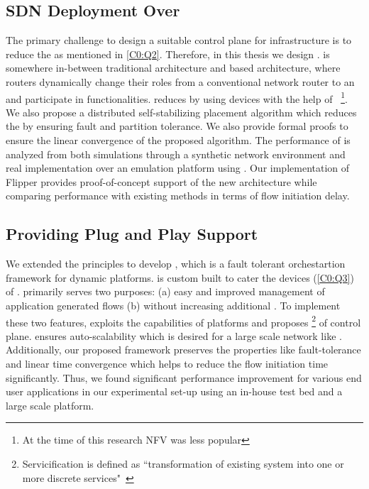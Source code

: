 \subsection{SDN Deployment Over }
The primary challenge to design a suitable  control plane for  infrastructure is to reduce the as mentioned in \cref{C0:Q2}. Therefore, in this thesis we design .  is somewhere in-between traditional architecture and  based architecture, where  routers dynamically change their roles from a conventional network router to an  and participate in  functionalities.  reduces  by using  devices with the help of ~\cite{koponen2010odc}\footnote{At the time of this research NFV was less popular}. We also propose a distributed self-stabilizing  placement algorithm which reduces the  by ensuring fault and partition tolerance. We also provide formal proofs to ensure the linear convergence of the proposed algorithm. The performance of  is analyzed from both simulations through a synthetic network environment and real implementation over an emulation platform using . Our implementation of Flipper provides proof-of-concept support of the new architecture while comparing performance with existing methods in terms of flow initiation delay.
\subsection{Providing Plug and Play Support}
 We extended the  principles to develop , which is a fault tolerant  orchestartion framework for dynamic  platforms.  is custom built to cater the  devices (\cref{C0:Q3}) of .  primarily serves two purposes: (a) easy and improved management of  application generated flows (b) without increasing additional . To implement these two features,  exploits the capabilities of  platforms and proposes \footnote{Servicification is defined as ``transformation of existing system into one or more discrete services"~\cite{define:servicification}} of control plane.  ensures auto-scalability which is desired for a large scale network like . Additionally, our proposed framework preserves the  properties like fault-tolerance and linear time convergence which helps to reduce the flow initiation time significantly. Thus, we found significant performance improvement for various end user applications in our experimental set-up using an in-house test bed and a large scale  platform. 
